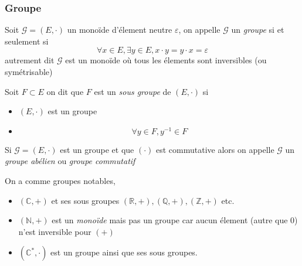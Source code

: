 \documentclass[11pt,colorlinks]{book}
\theoremstyle{mytheoremstyle}
\theoremstyle{mytheoremstyle}
\theoremstyle{mytheoremstyle}
\theoremstyle{mytheoremstyle}
\theoremstyle{mytheoremstyle}
\theoremstyle{mytheoremstyle}
\theoremstyle{mytheoremstyle}
\theoremstyle{mytheoremstyle}
\theoremstyle{myproblemstyle}
\def\mbb#1{\mathbb{#1}}
\def\bN{\mbb{N}}
\def\bC{\mbb{C}}
\def\bR{\mbb{R}}
\def\bQ{\mbb{Q}}
\def\bZ{\mbb{Z}}
\begin{document}
\subsubsection{Groupe}
\begin{definition}
  Soit $\mathcal G = (E,\cdot)$ un monoïde d'élement neutre $\varepsilon$, on appelle $\mathcal G$ un \textit{groupe} si et seulement si 
  \begin{equation*}
    \forall x \in E, \exists y \in E, x \cdot y = y \cdot x = \varepsilon
  \end{equation*}
  autrement dit $\mathcal G$ est un monoïde où tous les élements sont inversibles (ou symétrisable)
\end{definition}
\begin{definition}
  Soit $F \subset E$ on dit que $F$ est un \textit{sous groupe} de $(E,\cdot)$ si
  \begin{itemize}
    \item $(E,\cdot)$ est un groupe
    \item \begin{equation*}
      \forall y \in F, y^{-1} \in F
    \end{equation*}
  \end{itemize}
\end{definition}
\begin{rmq}
  Si $\mathcal G = (E,\cdot)$ est un groupe et que $(\cdot)$ est commutative alors on appelle $\mathcal G$ un \textit{groupe abélien} ou \textit{groupe commutatif}
\end{rmq}
\begin{ex}
  On a comme groupes notables,
  \begin{itemize}
    \item $(\bC,+)$ et ses sous groupes $(\bR,+),(\bQ,+),(\bZ,+)$ etc. 
    \item $(\bN,+)$ est un \textit{monoïde} mais pas un groupe car aucun élement (autre que $0$) n'est inversible pour $(+)$
    \item $(\bC^*,\cdot)$ est un groupe ainsi que ses sous groupes.
  \end{itemize}
\end{ex}
\end{document}
